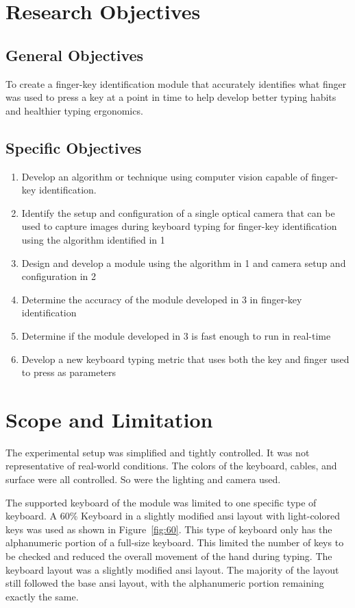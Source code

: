 \documentclass{report}
\begin{document}
\section{Research Objectives}

\subsection{General Objectives}
To create a finger-key identification module that accurately identifies what
finger was used to press a key at a point in time to help develop better typing
habits and healthier typing ergonomics.

\subsection{Specific Objectives}
\begin{enumerate}
	\item Develop an algorithm or technique using computer vision capable of
	      finger-key identification.
	\item Identify the setup and configuration of a single optical camera that can
	      be used to capture images during keyboard typing for finger-key
	      identification using the algorithm identified in 1
	\item Design and develop a module using the algorithm in 1 and camera setup
	      and configuration in 2
	\item Determine the accuracy of the module developed in 3 in finger-key
	      identification
	\item Determine if the module developed in 3 is fast enough to run in
	      real-time
	\item Develop a new keyboard typing metric that uses both the key and
	      finger used to press as parameters
\end{enumerate}

\section{Scope and Limitation}
The experimental setup was simplified and tightly controlled. It was not
representative of real-world conditions. The colors of the keyboard, cables, and
surface were all controlled. So were the lighting and camera used.

The supported keyboard of the module was limited to one specific type of
keyboard. A 60\% Keyboard in a slightly modified \ac{ansi} layout with
light-colored keys was used as shown in Figure~\ref{fig:60}. This type of
keyboard only has the alphanumeric portion of a full-size keyboard. This limited
the number of keys to be checked and reduced the overall movement of the hand
during typing. The keyboard layout was a slightly modified \ac{ansi} layout. The
majority of the layout still followed the base \ac{ansi} layout, with the
alphanumeric portion remaining exactly the same.
\end{document}
